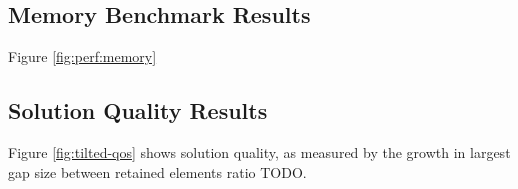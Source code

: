 

\subsection{Memory Benchmark Results}


Figure \ref{fig:perf:memory}

\subsection{Solution Quality Results}




Figure \ref{fig:tilted-qos} shows solution quality, as measured by the growth in largest gap size between retained elements ratio TODO.
